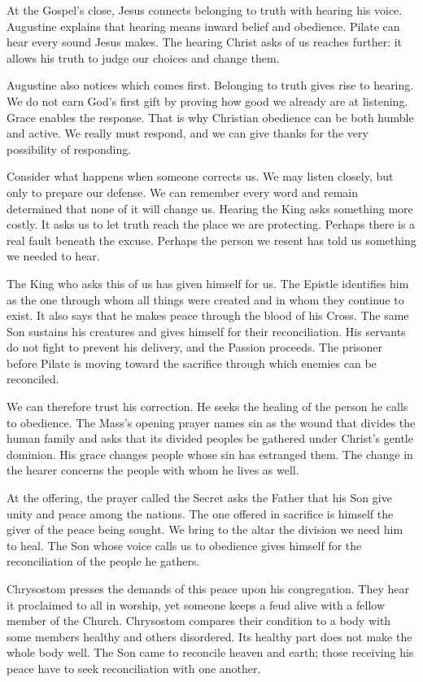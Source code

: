 At the Gospel's close, Jesus connects belonging to truth with hearing his voice. Augustine explains that hearing means inward belief and obedience. Pilate can hear every sound Jesus makes. The hearing Christ asks of us reaches further: it allows his truth to judge our choices and change them.

Augustine also notices which comes first. Belonging to truth gives rise to hearing. We do not earn God's first gift by proving how good we already are at listening. Grace enables the response. That is why Christian obedience can be both humble and active. We really must respond, and we can give thanks for the very possibility of responding.

Consider what happens when someone corrects us. We may listen closely, but only to prepare our defense. We can remember every word and remain determined that none of it will change us. Hearing the King asks something more costly. It asks us to let truth reach the place we are protecting. Perhaps there is a real fault beneath the excuse. Perhaps the person we resent has told us something we needed to hear.

The King who asks this of us has given himself for us. The Epistle identifies him as the one through whom all things were created and in whom they continue to exist. It also says that he makes peace through the blood of his Cross. The same Son sustains his creatures and gives himself for their reconciliation. His servants do not fight to prevent his delivery, and the Passion proceeds. The prisoner before Pilate is moving toward the sacrifice through which enemies can be reconciled.

We can therefore trust his correction. He seeks the healing of the person he calls to obedience. The Mass's opening prayer names sin as the wound that divides the human family and asks that its divided peoples be gathered under Christ's gentle dominion. His grace changes people whose sin has estranged them. The change in the hearer concerns the people with whom he lives as well.

At the offering, the prayer called the Secret asks the Father that his Son give unity and peace among the nations. The one offered in sacrifice is himself the giver of the peace being sought. We bring to the altar the division we need him to heal. The Son whose voice calls us to obedience gives himself for the reconciliation of the people he gathers.

Chrysostom presses the demands of this peace upon his congregation. They hear it proclaimed to all in worship, yet someone keeps a feud alive with a fellow member of the Church. Chrysostom compares their condition to a body with some members healthy and others disordered. Its healthy part does not make the whole body well. The Son came to reconcile heaven and earth; those receiving his peace have to seek reconciliation with one another.

